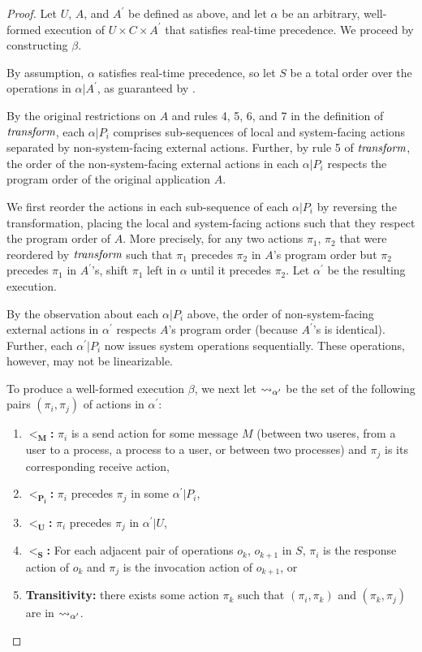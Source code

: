\begin{proof}
  Let $U$, $A$, and $A^\prime$ be defined as above, and let $\alpha$ be an arbitrary,
  well-formed execution of $U \times C \times A^\prime$ that satisfies \multidispatch{}
  real-time precedence. We proceed by constructing $\beta$.

  By assumption, $\alpha$ satisfies \multidispatch{} real-time precedence, so let $S$
  be a total order over the operations in $\alpha | A^\prime$, as guaranteed by \MDL{}.

  By the original restrictions on $A$ and rules 4, 5, 6, and 7 in the definition of $\operatorname*{\textit{transform}}$,
  each $\alpha | P_i$ comprises sub-sequences of local and system-facing actions separated by
  non-system-facing external actions. Further, by rule 5 of $\operatorname*{\textit{transform}}$, the order of the
  non-system-facing external actions in each $\alpha | P_i$ respects the program order of the
  original application $A$. 

  We first reorder the actions in each sub-sequence of each $\alpha | P_i$ by reversing the
  transformation, placing the local and system-facing actions such that they respect the program
  order of $A$. More precisely, for any two actions $\pi_1$, $\pi_2$ that were reordered by $\operatorname*{\textit{transform}}$
  such that $\pi_1$ precedes $\pi_2$ in $A$'s program order but $\pi_2$ precedes $\pi_1$ in $A^\prime$'s,
  shift $\pi_1$ left in $\alpha$ until it precedes $\pi_2$. Let $\alpha^\prime$ be the resulting execution.

  By the observation about each $\alpha | P_i$ above, the order of non-system-facing external actions
  in $\alpha^\prime$ respects $A$'s program order (because $A^\prime$'s is identical). Further,
  each $\alpha^\prime | P_i$ now issues system operations sequentially. These operations, however,
  may not be linearizable.

  To produce a well-formed execution $\beta$, we next let $\rightsquigarrow_{\alpha^\prime}$ be the set of the
  following pairs $(\pi_i, \pi_j)$ of actions in $\alpha^\prime$:
  \begin{enumerate}
    \item $\mathbf{<_M}$\textbf{:} $\pi_i$ is a send action for some message $M$ (between two useres,
    from a user to a process, a process to a user, or between two processes) and $\pi_j$
    is its corresponding receive action,
    \item $\mathbf{<_{P_i}}$\textbf{:} $\pi_i$ precedes $\pi_j$ in some $\alpha^\prime | P_i$,
    \item $\mathbf{<_U}$\textbf{:} $\pi_i$ precedes $\pi_j$ in $\alpha^\prime | U$,
    \item $\mathbf{<_S}$\textbf{:} For each adjacent pair of operations $o_k$, $o_{k+1}$ in $S$, $\pi_i$ is
    the response action of $o_k$ and $\pi_j$ is the invocation action of $o_{k+1}$, or
    \item \textbf{Transitivity:} there exists some action $\pi_k$ such that $(\pi_i, \pi_k)$
    and $(\pi_k, \pi_j)$ are in $\rightsquigarrow_{\alpha^\prime}$.
  \end{enumerate}


\end{proof}
